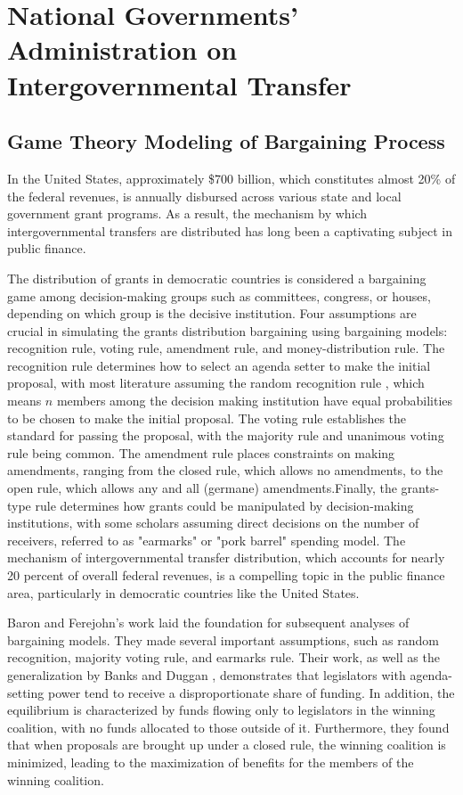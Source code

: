 \chapter{National Governments' Administration on Intergovernmental Transfer}

\section{Game Theory Modeling of Bargaining Process}
In the United States, approximately \$700 billion, which constitutes almost 20\% of the federal revenues, is annually disbursed across various state and local government grant programs. As a result, the mechanism by which intergovernmental transfers are distributed has long been a captivating subject in public finance.

The distribution of grants in democratic countries is considered a bargaining game among decision-making groups such as committees, congress, or houses, depending on which group is the decisive institution.  Four assumptions are crucial in simulating the grants distribution bargaining using bargaining models: recognition rule, voting rule, amendment rule, and money-distribution rule. The recognition rule determines how to select an agenda setter to make the initial proposal, with most literature assuming the random recognition rule \cite{kalandrakis2004three,anesi2015bargaining,diermeier2011legislative,rosenstiel2021congressional}, which means $n$ members among the decision making institution have equal probabilities to be chosen to make the initial proposal. The voting rule establishes the standard for passing the proposal, with the majority rule and unanimous voting rule being common. The amendment rule places constraints on making amendments, ranging from the closed rule, which allows no amendments, to the open rule, which allows any and all (germane) amendments.Finally, the grants-type rule determines how grants could be manipulated by decision-making institutions, with some scholars assuming direct decisions on the number of receivers, referred to as "earmarks" or "pork barrel" spending model. The mechanism of intergovernmental transfer distribution, which accounts for nearly 20 percent of overall federal revenues, is a compelling topic in the public finance area, particularly in democratic countries like the United States.

Baron and Ferejohn's work \cite{baron1989bargaining} laid the foundation for subsequent analyses of bargaining models. They made several important assumptions, such as random recognition, majority voting rule, and earmarks rule. Their work, as well as the generalization by Banks and Duggan \cite{banks2006general}, demonstrates that legislators with agenda-setting power tend to receive a disproportionate share of funding. In addition, the equilibrium is characterized by funds flowing only to legislators in the winning coalition, with no funds allocated to those outside of it. Furthermore, they found that when proposals are brought up under a closed rule, the winning coalition is minimized, leading to the maximization of benefits for the members of the winning coalition.

